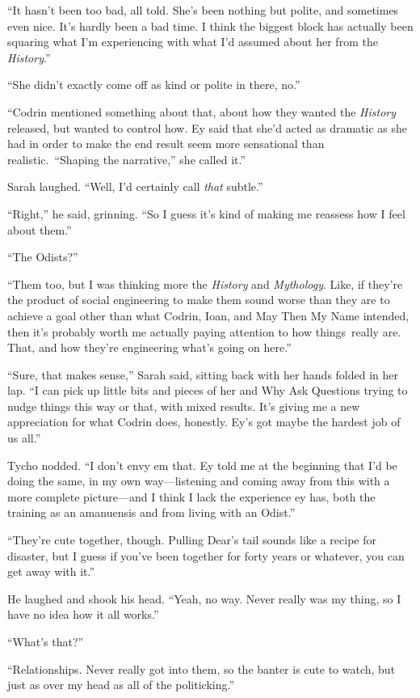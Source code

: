 ``It hasn't been too bad, all told. She's been nothing but polite, and sometimes even nice. It's hardly been a bad time. I think the biggest block has actually been squaring what I'm experiencing with what I'd assumed about her from the \emph{History}.''

``She didn't exactly come off as kind or polite in there, no.''

``Codrin mentioned something about that, about how they wanted the \emph{History} released, but wanted to control how. Ey said that she'd acted as dramatic as she had in order to make the end result seem more sensational than realistic.~``Shaping the narrative,'' she called it.''

Sarah laughed. ``Well, I'd certainly call \emph{that} subtle.''

``Right,'' he said, grinning. ``So I guess it's kind of making me reassess how I feel about them.''

``The Odists?''

``Them too, but I was thinking more the \emph{History} and \emph{Mythology}. Like, if they're the product of social engineering to make them sound worse than they are to achieve a goal other than what Codrin, Ioan, and May Then My Name intended, then it's probably worth me actually paying attention to how things\pagebreak~really are. That, and how they're engineering what's going on here.''

``Sure, that makes sense,'' Sarah said, sitting back with her hands folded in her lap. ``I can pick up little bits and pieces of her and Why Ask Questions trying to nudge things this way or that, with mixed results. It's giving me a new appreciation for what Codrin does, honestly. Ey's got maybe the hardest job of us all.''

Tycho nodded. ``I don't envy em that. Ey told me at the beginning that I'd be doing the same, in my own way—listening and coming away from this with a more complete picture—and I think I lack the experience ey has, both the training as an amanuensis and from living with an Odist.''

``They're cute together, though. Pulling Dear's tail sounds like a recipe for disaster, but I guess if you've been together for forty years or whatever, you can get away with it.''

He laughed and shook his head. ``Yeah, no way. Never really was my thing, so I have no idea how it all works.''

``What's that?''

``Relationships. Never really got into them, so the banter is cute to watch, but just as over my head as all of the politicking.''

